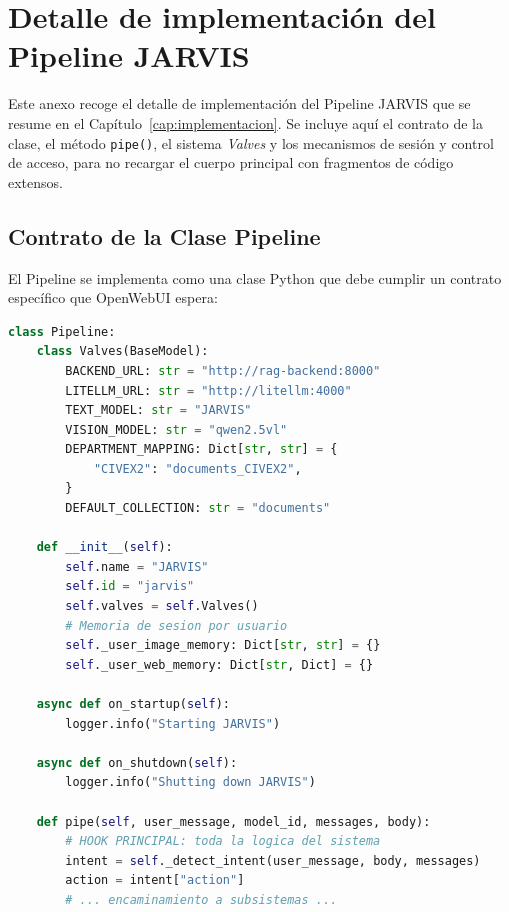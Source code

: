 \chapter{Detalle de implementación del Pipeline JARVIS}
\label{anexo:pipeline}

Este anexo recoge el detalle de implementación del Pipeline JARVIS que se resume en el Capítulo~\ref{cap:implementacion}. Se incluye aquí el contrato de la clase, el método \texttt{pipe()}, el sistema \textit{Valves} y los mecanismos de sesión y control de acceso, para no recargar el cuerpo principal con fragmentos de código extensos.

\section{Contrato de la Clase Pipeline}
\label{anexo:contrato-pipeline}

El Pipeline se implementa como una clase Python que debe cumplir un contrato específico que OpenWebUI espera:

\begin{lstlisting}[language=Python, caption={Estructura del Pipeline JARVIS.}]
class Pipeline:
    class Valves(BaseModel):
        BACKEND_URL: str = "http://rag-backend:8000"
        LITELLM_URL: str = "http://litellm:4000"
        TEXT_MODEL: str = "JARVIS"
        VISION_MODEL: str = "qwen2.5vl"
        DEPARTMENT_MAPPING: Dict[str, str] = {
            "CIVEX2": "documents_CIVEX2",
        }
        DEFAULT_COLLECTION: str = "documents"

    def __init__(self):
        self.name = "JARVIS"
        self.id = "jarvis"
        self.valves = self.Valves()
        # Memoria de sesion por usuario
        self._user_image_memory: Dict[str, str] = {}
        self._user_web_memory: Dict[str, Dict] = {}

    async def on_startup(self):
        logger.info("Starting JARVIS")

    async def on_shutdown(self):
        logger.info("Shutting down JARVIS")

    def pipe(self, user_message, model_id, messages, body):
        # HOOK PRINCIPAL: toda la logica del sistema
        intent = self._detect_intent(user_message, body, messages)
        action = intent["action"]
        # ... encaminamiento a subsistemas ...
\end{lstlisting}

